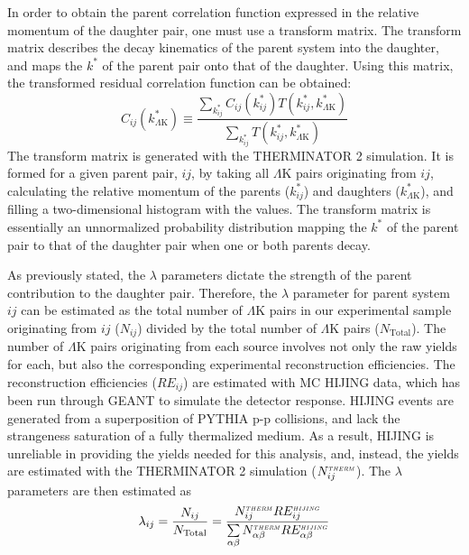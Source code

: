 \documentclass[ALICE,manyauthors]{cernphprep}
\newcommand{\kstar}{$k^{*}$\xspace}
\newcommand{\LamK}{$\Lambda$K\xspace}
\begin{document}
In order to obtain the parent correlation function expressed in the relative momentum of the daughter pair, one must use a transform matrix.
The transform matrix describes the decay kinematics of the parent system into the daughter, and maps the \kstar of the parent pair onto that of the daughter.
Using this matrix, the transformed residual correlation function can be obtained:
\begin{equation}
  C_{ij}(k^{*}_{\Lambda\mathrm{K}}) \equiv \frac{\sum\limits_{k^{*}_{ij}} C_{ij}\left(k^{*}_{ij}\right) T\left(k^{*}_{ij},k^{*}_{\Lambda\mathrm{K}}\right)}{\sum\limits_{k^{*}_{ij}} T\left(k^{*}_{ij},k^{*}_{\Lambda\mathrm{K}}\right)}
\label{eqn:ResidualsTransform}
\end{equation}
The transform matrix is generated with the THERMINATOR 2 \cite{Chojnacki:2011hb} simulation. 
It is formed for a given parent pair, $ij$, by taking all \LamK pairs originating from $ij$, calculating the relative momentum of the parents ($k^{*}_{ij}$) and daughters ($k^{*}_{\Lambda\mathrm{K}}$), and filling a two-dimensional histogram with the values. 
The transform matrix is essentially an unnormalized probability distribution mapping the \kstar of the parent pair to that of the daughter pair when one or both parents decay.
 
As previously stated, the $\lambda$ parameters dictate the strength of the parent contribution to the daughter pair.  
Therefore, the $\lambda$ parameter for parent system $ij$ can be estimated as the total number of \LamK pairs in our experimental sample originating from $ij$ ($N_{ij}$) divided by the total number of \LamK pairs ($N_{\mathrm{Total}}$).
The number of \LamK pairs originating from each source involves not only the raw yields for each, but also the corresponding experimental reconstruction efficiencies.
The reconstruction efficiencies ($RE_{ij}$) are estimated with MC HIJING data, which has been run through GEANT to simulate the detector response.
HIJING events are generated from a superposition of PYTHIA p-p collisions, and lack the strangeness saturation of a fully thermalized medium.
As a result, HIJING is unreliable in providing the yields needed for this analysis, and, instead, the yields are estimated with the THERMINATOR 2 simulation ($N_{ij}^{\scaleto{THERM}{3pt}}$).
The $\lambda$ parameters are then estimated as
\begin{equation}
\lambda_{ij} = \frac{N_{ij}}{N_{\mathrm{Total}}} = \frac{N_{ij}^{\scaleto{THERM}{3pt}}RE_{ij}^{\scaleto{HIJING}{3pt}}}{\sum\limits_{\alpha\beta} N_{\alpha\beta}^{\scaleto{THERM}{3pt}}RE_{\alpha\beta}^{\scaleto{HIJING}{3pt}}}
\end{equation}
\end{document}
